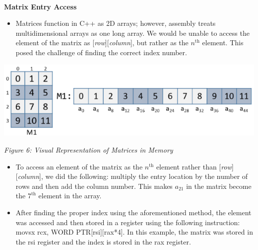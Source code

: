 \documentclass[twoside]{article}
\begin{document}
\noindent \\ \textbf{Matrix Entry Access}
\begin{itemize}
\item Matrices function in C++ as 2D arrays; however, assembly treats multidimensional arrays as one long array. We would be unable to access the element of the matrix as [\textit{row}][\textit{column}], but rather as the $n^{\text{th}}$ element. This posed the challenge of finding the correct index number.
\end{itemize}
\centerline{\includegraphics[scale=2]{images/matricesinmemory.png}}
\begin{center}\textit{Figure 6: Visual Representation of Matrices in Memory}\end{center}
\begin{itemize}
\item To access an element of the matrix as the $n^{\text{th}}$ element rather than [\textit{row}][\textit{column}], we did the following: multiply the entry location by the number of rows and then add the column number. This makes $a_{\text{21}}$ in the matrix become the $7^{\text{th}}$ element in the array.
\end{itemize}
\begin{itemize}
\item After finding the proper index using the aforementioned method, the element was accessed and then stored in a register using the following instruction: movsx rcx, WORD PTR[rsi][rax*4]. In this example, the matrix was stored in the rsi register and the index is stored in the rax register.
\end{itemize}
\end{document}

